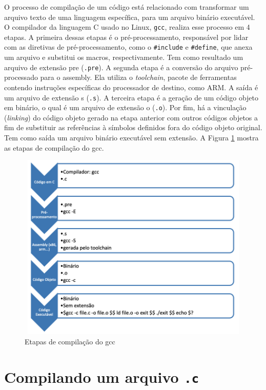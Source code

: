 O processo de compilação de um código está relacionado com transformar
um arquivo texto de uma linguagem específica, para um arquivo binário
executável. O compilador da linguagem C usado no Linux, \texttt{gcc},
realiza esse processo em 4 etapas. A primeira dessas etapas é o
pré-processamento, responsável por lidar com as diretivas de
pré-processamento, como o \texttt{\#include} e \texttt{\#define}, que
anexa um arquivo e substitui os macros, respectivamente. Tem como
resultado um arquivo de extensão pre (\texttt{.pre}). A segunda etapa é
a conversão do arquivo pré-processado para o assembly. Ela utiliza o
\emph{toolchain}, pacote de ferramentas contendo instruções específicas
do processador de destino, como ARM. A saída é um arquivo de extensão s
(\texttt{.s}). A terceira etapa é a geração de um código objeto em
binário, o qual é um arquivo de extensão o (\texttt{.o}). Por fim, há a
vinculação (\emph{linking}) do código objeto gerado na etapa anterior
com outros códigos objetos a fim de substituir as referências à símbolos
definidos fora do código objeto original. Tem como saída um arquivo
binário executável sem extensão. A Figura \ref{fig:Etapas de compilação do gcc} mostra as etapas de
compilação do gcc.

\begin{figure}[h!]
\centering
\includegraphics[width=12cm, height=9cm]{imagens/02/02 - compilação.png}
\caption{Etapas de compilação do gcc}
\label{fig:Etapas de compilação do gcc}
\end{figure}




\hypertarget{compilando-um-arquivo-.c}{%
\section{\texorpdfstring{Compilando um arquivo
\texttt{.c}}{Compilando um arquivo .c}}\label{compilando-um-arquivo-.c}}

